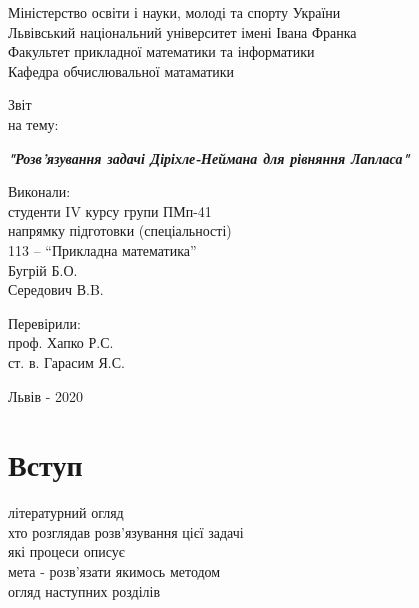 \documentclass[14pt,a4paper]{extarticle}
\newcounter{e}
\newcounter{tabl}
\numberwithin{equation}{section}
\numberwithin{figure}{section}
\begin{document}
	

 \thispagestyle{empty}

 \begin{center}
	\large
	Міністерство освіти і науки, молоді та спорту України \\
	Львівський національний університет імені Івана Франка \\
	Факультет прикладної математики та інформатики \\
	Кафедра обчислювальної матаматики
 \end{center}

 \vspace{45pt}

 \vfill

 \begin{center}
	{\Huge{Звіт}}\\
	{\large на тему:}
 \end{center}

 \begin{center}\Large
	\textbf{\emph{"Розв'язування задачі Діріхле-Неймана для рівняння Лапласа"}}
 \end{center}

 \vfill
 \vskip100pt

 \begin{flushleft}
	\hskip8cm 
	Виконали:
	\\ \hskip8cm 
	студенти IV курсу групи ПМп-41
	\\ \hskip8cm
	напрямку підготовки (спеціальності)
	\\ \hskip8cm
	113 -- ``Прикладна математика''
	\\ \hskip8cm
	Бугрій Б.О.
	\\ \hskip8cm
	Середович В.B.
 \end{flushleft}

 \begin{flushleft}
	\hskip8cm 
	Перевірили:
	\\ \hskip8cm
	проф. Хапко Р.С.
	\\ \hskip8cm
	ст. в. Гарасим Я.С.
 \end{flushleft}

 \vfill

 \begin{center}
	\large
	Львів - 2020
 \end{center}

 \newpage
 \thispagestyle{empty}
 \tableofcontents

 \newpage
 \thispagestyle{empty}
 \section*{Вступ}
 \begin{center}\end{center}
 літературний огляд \\
 хто розглядав розв'язування цієї задачі \\
 які процеси описує \\
 мета - розв'язати якимось методом \\
 огляд наступних розділів
\end{document}
